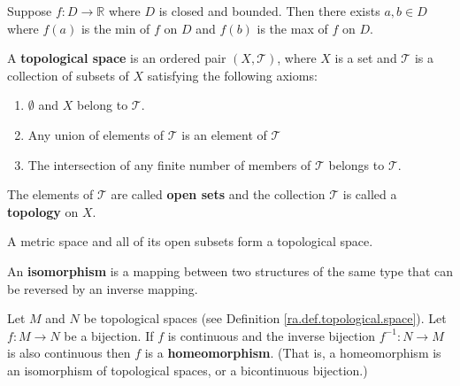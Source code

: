 \begin{corollary} Suppose \(f: D \to \mathbb{R}\) where \(D\) is closed and bounded. Then there exists \(a, b \in D\) where \(f(a)\) is the min of \(f\) on \(D\) and \(f(b)\) is the max of \(f\) on \(D\).

\end{corollary}


\begin{definition}\label{ra.def.topological.space}

A \textbf{topological space} is an ordered pair \((X, \mathcal{T})\), where \(X\) is a set and \(\mathcal{T}\) is a collection of subsets of \(X\) satisfying the following axioms:

\begin{enumerate}

\item \(\emptyset\) and \(X\) belong to \(\mathcal{T}\).

\item Any union of elements of \(\mathcal{T}\) is an element of \(\mathcal{T}\)

\item The intersection of any finite number of members of \(\mathcal{T}\) belongs to \(\mathcal{T}\).

\end{enumerate}

The elements of \(\mathcal{T}\) are called \textbf{open sets} and the collection \(\mathcal{T}\) is called a \textbf{topology} on \(X\). 

\end{definition}

\begin{theorem}

A metric space and all of its open subsets form a topological space.

\end{theorem}

\begin{definition}\label{ra.def.isomorphism}

An \textbf{isomorphism} is a mapping between two structures of the same type that can be reversed by an inverse mapping.

\end{definition}

\begin{definition}\label{ra.def.homeomorphism}

Let \(M\) and \(N\) be topological spaces (see Definition \ref{ra.def.topological.space}). Let \(f: M \to N\) be a bijection. If \(f\) is continuous and the inverse bijection \(f^{-1}: N \to M\) is also continuous then \(f\) is a \textbf{homeomorphism}. (That is, a homeomorphism is an isomorphism of topological spaces, or a bicontinuous bijection.)

\end{definition}

